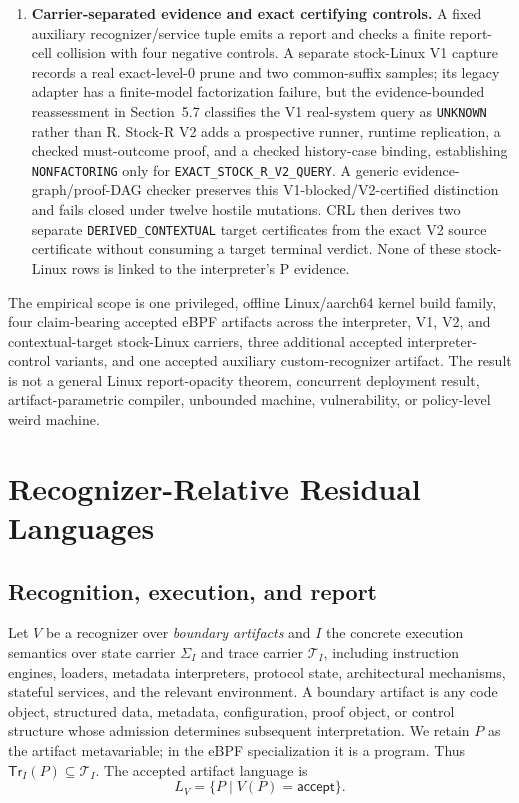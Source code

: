 \documentclass[conference]{IEEEtran}
\begin{document}
\begin{enumerate}
\item \textbf{Carrier-separated evidence and exact certifying controls.} A fixed auxiliary recognizer/service tuple emits a report and checks a finite report-cell collision with four negative controls. A separate stock-Linux V1 capture records a real exact-level-0 prune and two common-suffix samples; its legacy adapter has a finite-model factorization failure, but the evidence-bounded reassessment in Section~5.7 classifies the V1 real-system query as \texttt{UNKNOWN} rather than R. Stock-R V2 adds a prospective runner, runtime replication, a checked must-outcome proof, and a checked history-case binding, establishing \texttt{NONFACTORING} only for \texttt{EXACT\_STOCK\_R\_V2\_QUERY}. A generic evidence-graph/proof-DAG checker preserves this V1-blocked/V2-certified distinction and fails closed under twelve hostile mutations. CRL then derives two separate \texttt{DERIVED\_CONTEXTUAL} target certificates from the exact V2 source certificate without consuming a target terminal verdict. None of these stock-Linux rows is linked to the interpreter's P evidence.
\end{enumerate}

The empirical scope is one privileged, offline Linux/aarch64 kernel build family, four claim-bearing accepted eBPF artifacts across the interpreter, V1, V2, and contextual-target stock-Linux carriers, three additional accepted interpreter-control variants, and one accepted auxiliary custom-recognizer artifact. The result is not a general Linux report-opacity theorem, concurrent deployment result, artifact-parametric compiler, unbounded machine, vulnerability, or policy-level weird machine.

\section{Recognizer-Relative Residual Languages}

\subsection{Recognition, execution, and report}

Let $V$ be a recognizer over \emph{boundary artifacts} and $I$ the concrete execution semantics over state carrier $\Sigma_I$ and trace carrier $\mathcal T_I$, including instruction engines, loaders, metadata interpreters, protocol state, architectural mechanisms, stateful services, and the relevant environment. A boundary artifact is any code object, structured data, metadata, configuration, proof object, or control structure whose admission determines subsequent interpretation. We retain $P$ as the artifact metavariable; in the eBPF specialization it is a program. Thus $\mathsf{Tr}_I(P)\subseteq\mathcal T_I$. The accepted artifact language is
\begin{equation}
L_V = \{P \mid V(P)=\mathsf{accept}\}.
\end{equation}
\end{document}
